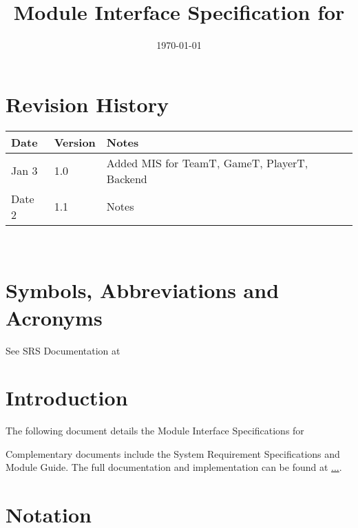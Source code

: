 \documentclass[12pt, titlepage]{article}
\begin{document}
\title{Module Interface Specification for \progname{}}

\author{\authname}

\date{\today}

\maketitle


\section{Revision History}

\begin{tabularx}{\textwidth}{p{3cm}p{2cm}X}
\toprule {\bf Date} & {\bf Version} & {\bf Notes}\\
\midrule
Jan 3 & 1.0 & Added MIS for TeamT, GameT, PlayerT, Backend\\
Date 2 & 1.1 & Notes\\
\bottomrule
\end{tabularx}

~\newpage

\section{Symbols, Abbreviations and Acronyms}

See SRS Documentation at 


\newpage

\tableofcontents

\newpage


\section{Introduction}

The following document details the Module Interface Specifications for

Complementary documents include the System Requirement Specifications
and Module Guide.  The full documentation and implementation can be
found at \url{...}.  

\section{Notation}
\end{document}
